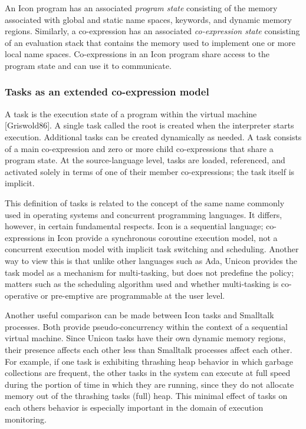 An Icon program has an associated \textit{program state} consisting of
the memory associated with global and static name spaces, keywords, and
dynamic memory regions. Similarly, a co-expression has an associated
\textit{co-expression state} consisting of an evaluation stack that
contains the memory used to implement one or more local name spaces.
Co-expressions in an Icon program share access to the program state and
can use it to communicate. 

\subsubsection{Tasks as an extended co-expression model}

A task is the execution state of a program within the virtual machine
[Griswold86]. A single task called the root is created when the
interpreter starts execution. Additional tasks can be created
dynamically as needed.
A task consists of a main co-expression and zero or more child
co-expressions that share a program state. At the source-language
level, tasks are loaded, referenced, and activated solely in terms of
one of their member co-expressions; the task itself is
implicit.

This definition of tasks is related to the concept of the same name
commonly used in operating systems and concurrent programming
languages. It differs, however, in certain fundamental respects. Icon
is a sequential language; co-expressions in Icon provide a synchronous
coroutine execution model, not a concurrent execution model with
implicit task switching and scheduling. Another way to view this is
that unlike other languages such as Ada, Unicon provides the task model
as a mechanism for multi-tasking, but does not predefine the policy;
matters such as the scheduling algorithm used and whether multi-tasking
is co-operative or pre-emptive are programmable at the user
level.

Another useful comparison can be made between Icon tasks and Smalltalk
processes. Both provide pseudo-concurrency within the context of a
sequential virtual machine. Since Unicon tasks have their own dynamic
memory regions, their presence affects each other less than Smalltalk
processes affect each other. For example, if one task is exhibiting
thrashing heap behavior in which garbage collections are frequent, the
other tasks in the system can execute at full speed during the portion
of time in which they are running, since they do not allocate memory
out of the thrashing task{\textquotesingle}s (full) heap. This minimal
effect of tasks on each others{\textquotesingle} behavior is especially
important in the domain of execution monitoring. 

